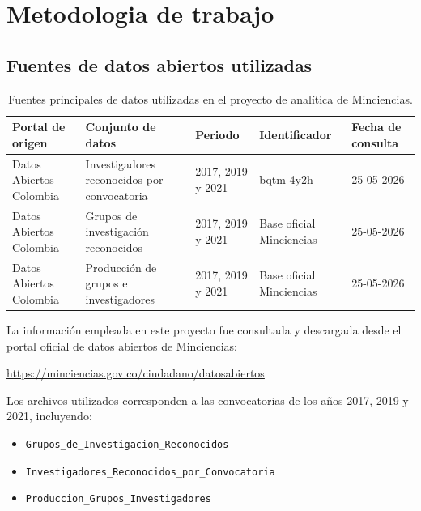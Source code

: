 \documentclass[12pt,letterpaper]{article}
\begin{document}
\section{Metodologia de trabajo}

\subsection{Fuentes de datos abiertos utilizadas}

\begin{table}[H]
\centering
\small
\renewcommand{\arraystretch}{1.2}

\begin{tabular}{p{3.5cm} p{4.8cm} p{2cm} p{2.2cm} p{2.5cm}}
\toprule
\textbf{Portal de origen} & 
\textbf{Conjunto de datos} & 
\textbf{Periodo} & 
\textbf{Identificador} & 
\textbf{Fecha de consulta} \\
\midrule

Datos Abiertos Colombia &
Investigadores reconocidos por convocatoria &
2017, 2019 y 2021 &
bqtm-4y2h &
25-05-2026 \\

Datos Abiertos Colombia &
Grupos de investigación reconocidos &
2017, 2019 y 2021 &
Base oficial Minciencias &
25-05-2026 \\

Datos Abiertos Colombia &
Producción de grupos e investigadores &
2017, 2019 y 2021 &
Base oficial Minciencias &
25-05-2026 \\

\bottomrule
\end{tabular}

\caption{Fuentes principales de datos utilizadas en el proyecto de analítica de Minciencias.}
\label{tab:fuentes_datos}

\end{table}


La información empleada en este proyecto fue consultada y descargada desde el portal oficial de datos abiertos de Minciencias:

\begin{center}
\url{https://minciencias.gov.co/ciudadano/datosabiertos}
\end{center}

Los archivos utilizados corresponden a las convocatorias de los años 2017, 2019 y 2021, incluyendo:

\begin{itemize}
    \item \texttt{Grupos\_de\_Investigacion\_Reconocidos}
    \item \texttt{Investigadores\_Reconocidos\_por\_Convocatoria}
    \item \texttt{Produccion\_Grupos\_Investigadores}
\end{itemize}
\end{document}

